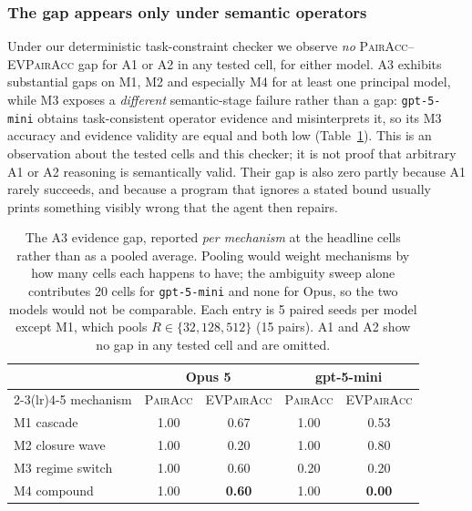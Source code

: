 \documentclass[sigconf,anonymous,review]{acmart}
\newcommand{\pairacc}{\textsc{PairAcc}}
\newcommand{\evpair}{\textsc{EVPairAcc}}
\begin{document}
\subsubsection{The gap appears only under semantic operators}
Under our deterministic task-constraint checker we observe \emph{no} \pairacc--\evpair{} gap for
A1 or A2 in any tested cell, for either model. A3 exhibits substantial gaps on M1, M2 and
especially M4 for at least one principal model, while M3 exposes a \emph{different} semantic-stage
failure rather than a gap: \texttt{gpt-5-mini} obtains task-consistent operator evidence and
misinterprets it, so its M3 accuracy and evidence validity are equal and both low
(Table~\ref{tab:gap}). This is an observation about the tested cells and this
checker; it is not proof that arbitrary A1 or A2 reasoning is semantically valid. Their gap is
also zero partly because A1 rarely succeeds, and because a program that ignores a stated bound
usually prints something visibly wrong that the agent then repairs.

\begin{table}[t]
\caption{The A3 evidence gap, reported \emph{per mechanism} at the headline cells rather than as a
pooled average. Pooling would weight mechanisms by how many cells each happens to have; the
ambiguity sweep alone contributes 20 cells for \texttt{gpt-5-mini} and none for Opus, so the
two models would not be comparable. Each entry is 5 paired seeds per model except M1, which pools
$R\in\{32,128,512\}$ (15 pairs). A1 and A2 show no gap in any tested cell and are omitted.}
\label{tab:gap}
\small
\begin{tabular}{@{}lcccc@{}}
\toprule
& \multicolumn{2}{c}{Opus 5} & \multicolumn{2}{c}{gpt-5-mini} \\
\cmidrule(lr){2-3}\cmidrule(lr){4-5}
mechanism & \pairacc & \evpair & \pairacc & \evpair \\
\midrule
M1 cascade       & 1.00 & 0.67 & 1.00 & 0.53 \\
M2 closure wave  & 1.00 & 0.20 & 1.00 & 0.80 \\
M3 regime switch & 1.00 & 0.60 & 0.20 & 0.20 \\
M4 compound      & 1.00 & \textbf{0.60} & 1.00 & \textbf{0.00} \\
\bottomrule
\end{tabular}
\end{table}
\end{document}
